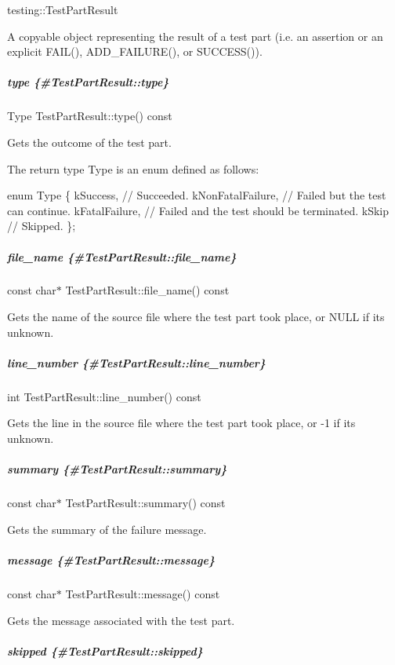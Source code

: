{\ttfamily testing\+::\+Test\+Part\+Result}

A copyable object representing the result of a test part (i.\+e. an assertion or an explicit {\ttfamily F\+A\+I\+L()}, {\ttfamily A\+D\+D\+\_\+\+F\+A\+I\+L\+U\+R\+E()}, or {\ttfamily S\+U\+C\+C\+E\+S\+S()}).

\subparagraph*{type \{\#\+Test\+Part\+Result\+::type\}}

{\ttfamily Type Test\+Part\+Result\+::type() const}

Gets the outcome of the test part.

The return type {\ttfamily Type} is an enum defined as follows\+:


\begin{DoxyCode}
\textcolor{keyword}{enum} Type \{
  kSuccess,          \textcolor{comment}{// Succeeded.}
  kNonFatalFailure,  \textcolor{comment}{// Failed but the test can continue.}
  kFatalFailure,     \textcolor{comment}{// Failed and the test should be terminated.}
  kSkip              \textcolor{comment}{// Skipped.}
\};
\end{DoxyCode}


\subparagraph*{file\+\_\+name \{\#\+Test\+Part\+Result\+::file\+\_\+name\}}

{\ttfamily const char$\ast$ Test\+Part\+Result\+::file\+\_\+name() const}

Gets the name of the source file where the test part took place, or {\ttfamily N\+U\+LL} if it\textquotesingle{}s unknown.

\subparagraph*{line\+\_\+number \{\#\+Test\+Part\+Result\+::line\+\_\+number\}}

{\ttfamily int Test\+Part\+Result\+::line\+\_\+number() const}

Gets the line in the source file where the test part took place, or {\ttfamily -\/1} if it\textquotesingle{}s unknown.

\subparagraph*{summary \{\#\+Test\+Part\+Result\+::summary\}}

{\ttfamily const char$\ast$ Test\+Part\+Result\+::summary() const}

Gets the summary of the failure message.

\subparagraph*{message \{\#\+Test\+Part\+Result\+::message\}}

{\ttfamily const char$\ast$ Test\+Part\+Result\+::message() const}

Gets the message associated with the test part.

\subparagraph*{skipped \{\#\+Test\+Part\+Result\+::skipped\}}

